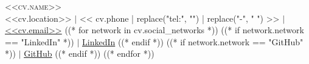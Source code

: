 \begin{center}
  {\LARGE\scshape <<cv.name>>} \\ \vspace{3pt}
  \small
  <<cv.location>> $|$ << cv.phone | replace("tel:", "") | replace("-", " ") >> $|$
  \href{mailto:<<cv.email>>}{<<cv.email>>}
  ((* for network in cv.social_networks *))
  ((* if network.network == "LinkedIn" *))
  $|$ \href{https://linkedin.com/in/<<network.username>>}{LinkedIn}
  ((* endif *))
  ((* if network.network == "GitHub" *))
  $|$ \href{https://github.com/<<network.username>>}{GitHub}
  ((* endif *))
  ((* endfor *))
\end{center}
\vspace{-4pt}
